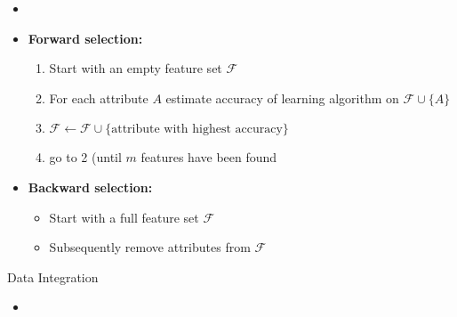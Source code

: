 \begin{frame}
	\begin{itemize}
		\item 
	\end{itemize}
\end{frame}


\begin{frame}
\end{frame}


\begin{frame}
	\begin{itemize}
		\item \textbf{Forward selection:}
		\begin{enumerate}
			\item Start with an empty feature set $\mathcal{F}$
			\item For each attribute $A$ estimate accuracy of learning algorithm on $\mathcal{F} \cup \{ A \}$
			\item $\mathcal{F} \longleftarrow \mathcal{F} \cup \{ \text{attribute with highest accuracy} \}$
			\item go to 2 (until $m$ features have been found
		\end{enumerate}
		\item \textbf{Backward selection:}
		\begin{itemize}
			\item Start with a full feature set $\mathcal{F}$
			\item Subsequently remove attributes from $\mathcal{F}$
		\end{itemize}
	\end{itemize}
\end{frame}


\begin{dwHeaderFrame}{Data Integration}
	\begin{itemize}
		\item
	\end{itemize}
\end{dwHeaderFrame}


